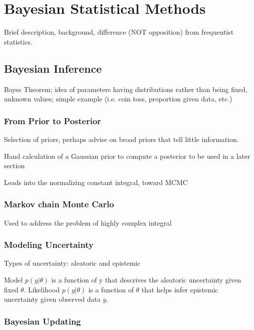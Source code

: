 \chapter{Bayesian Statistical Methods}

Brief description, background, difference (NOT opposition) from frequentist statistics.


\section{Bayesian Inference} %

Bayes Theorem; idea of parameters having distributions rather than being fixed, unknown values; simple example (i.e. coin toss, proportion given data, etc.) 


\subsection{From Prior to Posterior}

Selection of priors, perhaps advise on broad priors that tell little information.

Hand calculation of a Gaussian prior to compute a posterior to be used in a later section


Leads into the normalizing constant integral, toward MCMC


\subsection{Markov chain Monte Carlo}
Used to address the problem of highly complex integral


\subsection{Modeling Uncertainty}

Types of uncertainty: aleatoric and epistemic

Model $p(y|\theta)$ is a function of y that descrives the aleatoric uncertainty given fixed $\theta$.
Likelihood $p(y|\theta)$ is a function of $\theta$ that helps infer epistemic uncertainty given observed data $y$.



\subsection{Bayesian Updating}


